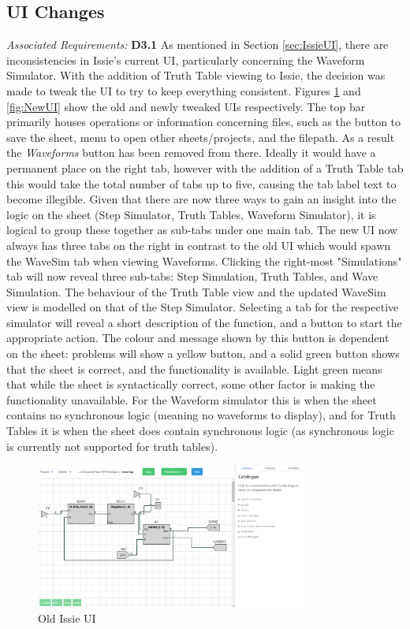 \subsection{UI Changes}
\emph{Associated Requirements:} \textbf{D3.1}
As mentioned in Section \ref{sec:IssieUI}, there are inconsistencies in Issie's current UI, particularly concerning the Waveform Simulator. With the addition of Truth Table viewing to Issie, the decision was made to tweak the UI to try to keep everything consistent. Figures \ref{fig:OldUI} and \ref{fig:NewUI} show the old and newly tweaked UIs respectively. The top bar primarily houses operations or information concerning files, such as the button to save the sheet, menu to open other sheets/projects, and the filepath. As a result the \textit{Waveforms} button has been removed from there. Ideally it would have a permanent place on the right tab, however with the addition of a Truth Table tab this would take the total number of tabs up to five, causing the tab label text to become illegible.  Given that there are now three ways to gain an insight into the logic on the sheet (Step Simulator, Truth Tables, Waveform Simulator), it is logical to group these together as sub-tabs under one main tab. The new UI now always has three tabs on the right in contrast to the old UI which would spawn the WaveSim tab when viewing Waveforms. Clicking the right-most "Simulations" tab will now reveal three sub-tabs: Step Simulation, Truth Tables, and Wave Simulation. The behaviour of the Truth Table view and the updated WaveSim view is modelled on that of the Step Simulator. Selecting a tab for the respective simulator will reveal a short description of the function, and a button to start the appropriate action. The colour and message shown by this button is dependent on the sheet: problems will show a yellow button, and a solid green button shows that the sheet is correct, and the functionality is available. Light green means that while the sheet is syntactically correct, some other factor is making the functionality unavailable. For the Waveform simulator this is when the sheet contains no synchronous logic (meaning no waveforms to display), and for Truth Tables it is when the sheet does contain synchronous logic (as synchronous logic is currently not supported for truth tables).

\begin{figure}
    \centering
    \includegraphics[width=0.8\textwidth]{05.ImpPlan/OldUI.png}
    \caption{Old Issie UI}
    \label{fig:OldUI}
\end{figure}


